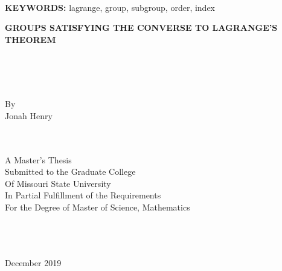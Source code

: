 \documentclass[12pt]{report}
\theoremstyle{newthm}
\begin{document}
\\
\noindent\textbf{KEYWORDS:} lagrange, group, subgroup, order, index
\newpage

%
\centerline{\textbf{GROUPS SATISFYING THE CONVERSE TO LAGRANGE'S THEOREM}}
\\~\\~\\
\begin{center}
   By\\
   Jonah Henry\\~\\~\\
   \begin{spacing}{1}
   A Master's Thesis\\
   Submitted to the Graduate College\\
   Of Missouri State University\\
   In Partial Fulfillment of the Requirements \\
   For the Degree of Master of Science, Mathematics
   \end{spacing}
   \\~\\~\\
   December 2019
\end{center}
\\~\\
\end{document}
